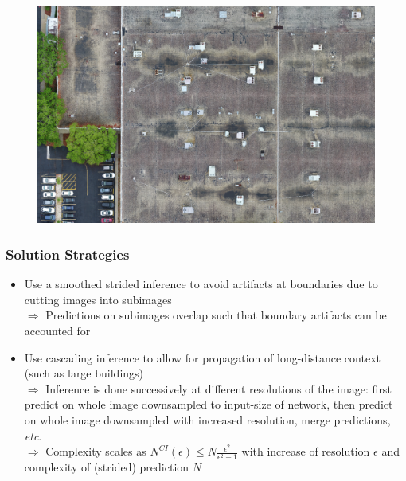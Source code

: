 \documentclass{beamer}
\begin{document}
\begin{frame}
\begin{minipage}{0.3\textwidth}
\begin{figure}
\begin{turn}{90}
\includegraphics[width=\textwidth]{images/roof.png}
\end{turn}
\end{figure}
\end{minipage}
\end{frame}


\begin{frame}
\frametitle{Solution Strategies}
\begin{itemize}
\item Use a smoothed strided inference to avoid artifacts at boundaries due to cutting images into subimages\\
$\Rightarrow$ Predictions on subimages overlap such that boundary artifacts can be accounted for
\item Use cascading inference to allow for propagation of long-distance context (such as large buildings)\\
$\Rightarrow$ Inference is done successively at different resolutions of the image: first predict on whole image downsampled to input-size of network, then predict on whole image downsampled with increased resolution, merge predictions, \textit{etc}.\\
$\Rightarrow$ Complexity scales as $N^{CI}(\epsilon) \leq N \frac{\epsilon^2}{\epsilon^2 -1}$ with increase of resolution $\epsilon$ and complexity of (strided) prediction $N$
\end{itemize}
\end{frame}
\end{document}
